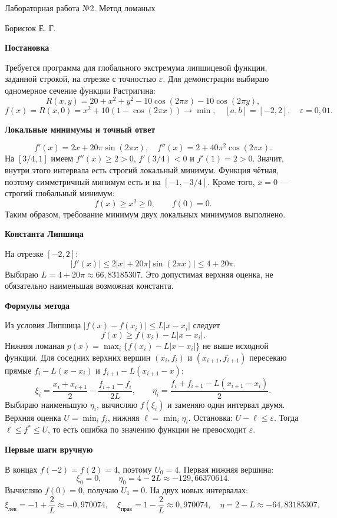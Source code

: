 \documentclass[12pt,a4paper]{article}
\begin{document}
\begin{center}\large Лабораторная работа №2. Метод ломаных\end{center}
Борисюк Е. Г.
\par\textbf{Постановка}\par
Требуется программа для глобального
экстремума липшицевой функции, заданной строкой, на отрезке с точностью $\varepsilon$.
Для демонстрации выбираю одномерное сечение функции Растригина:
\[
R(x,y)=20+x^2+y^2-10\cos(2\pi x)-10\cos(2\pi y),
\]
\[
f(x)=R(x,0)=x^2+10(1-\cos(2\pi x))\to\min,
\quad [a,b]=[-2,2],\quad\varepsilon=0{,}01.
\]
\par\textbf{Локальные минимумы и точный ответ}\par
\[
f'(x)=2x+20\pi\sin(2\pi x),\quad
f''(x)=2+40\pi^2\cos(2\pi x).
\]
На $[3/4,1]$ имеем $f''(x)\ge2>0$, $f'(3/4)<0$ и $f'(1)=2>0$.
Значит, внутри этого интервала есть строгий локальный минимум.
Функция чётная, поэтому симметричный минимум есть и на $[-1,-3/4]$.
Кроме того, $x=0$ --- строгий глобальный минимум:
\[
f(x)\ge x^2\ge0,\qquad f(0)=0.
\]
Таким образом, требование минимум двух локальных минимумов выполнено.
\par\textbf{Константа Липшица}\par
На отрезке $[-2,2]$:
\[
|f'(x)|\le2|x|+20\pi|\sin(2\pi x)|\le4+20\pi.
\]
Выбираю $L=4+20\pi\approx66{,}83185307$. Это допустимая верхняя оценка,
не обязательно наименьшая возможная константа.
\par\textbf{Формулы метода}\par
Из условия Липшица $|f(x)-f(x_i)|\le L|x-x_i|$ следует
\[
f(x)\ge f(x_i)-L|x-x_i|.
\]
Нижняя ломаная $p(x)=\max_i\{f(x_i)-L|x-x_i|\}$ не выше исходной функции.
Для соседних верхних вершин $(x_i,f_i)$ и $(x_{i+1},f_{i+1})$
пересекаю прямые $f_i-L(x-x_i)$ и $f_{i+1}-L(x_{i+1}-x)$:
\[
\boxed{\xi_i=\frac{x_i+x_{i+1}}2-\frac{f_{i+1}-f_i}{2L}},\qquad
\boxed{\eta_i=\frac{f_i+f_{i+1}-L(x_{i+1}-x_i)}2}.
\]
Выбираю наименьшую $\eta_i$, вычисляю $f(\xi_i)$ и заменяю один интервал двумя.
Верхняя оценка $U=\min_i f_i$, нижняя $\ell=\min_i\eta_i$.
Остановка: $U-\ell\le\varepsilon$. Тогда $\ell\le f^*\le U$,
то есть ошибка по значению функции не превосходит $\varepsilon$.
\newpage
\par\textbf{Первые шаги вручную}\par
В концах $f(-2)=f(2)=4$, поэтому $U_0=4$.
Первая нижняя вершина:
\[
\xi_0=0,\qquad \eta_0=4-2L\approx-129{,}66370614.
\]
Вычисляю $f(0)=0$, получаю $U_1=0$. На двух новых интервалах:
\[
\xi_{\text{лев}}=-1+\frac2L\approx-0{,}970074,
\quad \xi_{\text{прав}}=1-\frac2L\approx0{,}970074,
\quad\eta=2-L\approx-64{,}83185307.
\]
\end{document}
